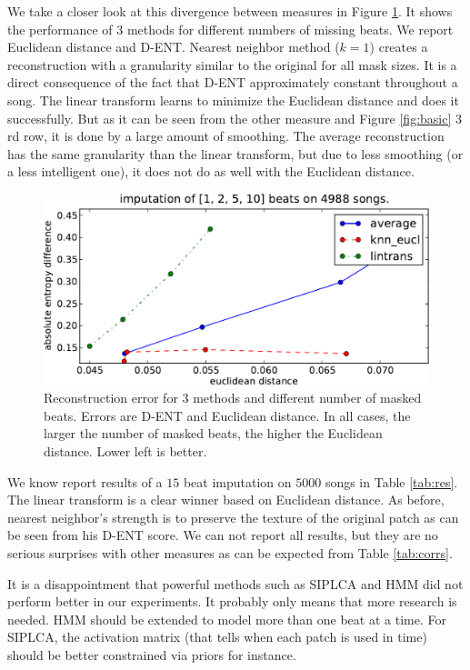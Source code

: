 \documentclass{article}
\begin{document}
We take a closer look at this divergence between measures in Figure
\ref{fig:2dscore}.  It shows the performance of $3$ methods for
different numbers of missing beats. We report Euclidean distance and
D-ENT.  Nearest neighbor method ($k=1$) creates a reconstruction with
a granularity similar to the original for all mask sizes. It is a
direct consequence of the fact that D-ENT approximately constant
throughout a song. The linear transform learns to minimize the
Euclidean distance and does it successfully. But as it can be seen
from the other measure and Figure \ref{fig:basic} $3$rd row, it is
done by a large amount of smoothing. The average reconstruction has
the same granularity than the linear transform, but due to less
smoothing (or a less intelligent one), it does not do as well with the
Euclidean distance.

\begin{figure}[t]
\begin{center}
\includegraphics[width=.9\columnwidth]{recon_score_in_2d_5k}
\end{center}
\caption{Reconstruction error for $3$ methods and different
number of masked beats. Errors are D-ENT and Euclidean
distance. In all cases, the larger the number of masked beats,
the higher the Euclidean distance. Lower left is better.
\label{fig:2dscore}}
\end{figure}

We know report results of a $15$ beat imputation on $5000$ songs in
Table \ref{tab:res}. The linear transform is a clear winner based
on Euclidean distance. As before, nearest neighbor's strength
is to preserve the texture of the original patch as can be seen
from his D-ENT score. We can not report all results, but they
are no serious surprises with other measures 
as can be expected from Table \ref{tab:corrs}.

It is a disappointment that powerful methods such as SIPLCA
and HMM did not perform better in our experiments. It
probably only means that more research is needed. HMM should
be extended to model more than one beat at a time. For SIPLCA,
the activation matrix (that tells when each patch is used in time)
should be better constrained via priors for instance.
\end{document}
